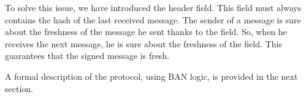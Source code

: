 To solve this issue, we have introduced the  header field. This
field must always contains the hash of the last received message. The sender of
a message is sure about the freshness of the message he sent thanks to the
 field. So, when he receives the next message, he is sure about the
freshness of the  field. This guarantees that the signed
message is fresh.

A formal description of the protocol, using BAN logic, is provided in the next
section.
